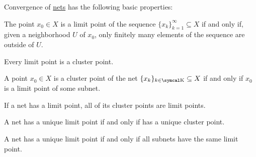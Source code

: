 \begin{proposition}\label{thm:net_convergence_properties}
  Convergence of \hyperref[def:net_convergence]{nets} has the following basic properties:

  \begin{PropEnum}
     The point \( x_0 \in X \) is a limit point of the sequence \( \{ x_k \}_{k=1}^\infty \subseteq X \) if and only if, given a neighborhood \( U \) of \( x_0 \), only finitely many elements of the sequence are outside of \( U \).

     Every limit point is a cluster point.

     A point \( x_0 \in X \) is a cluster point of the net \( \{ x_k \}_{k \in \CK} \subseteq X \) if and only if \( x_0 \) is a limit point of some subnet.

     If a net has a limit point, all of its cluster points are limit points.

     A net has a unique limit point if and only if has a unique cluster point.

     A net has a unique limit point if and only if all subnets have the same limit point.
  \end{PropEnum}
\end{proposition}
